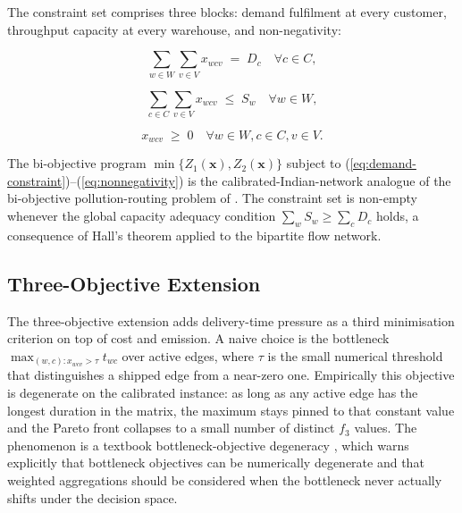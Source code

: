 \documentclass[review,preprint,authoryear,12pt]{elsarticle}
\begin{document}
The constraint set comprises three blocks: demand fulfilment at
every customer, throughput capacity at every warehouse, and
non-negativity:

\begin{equation}
\sum_{w \in W} \sum_{v \in V} x_{wcv} \;=\; D_c
\quad \forall c \in C,
\label{eq:demand-constraint}
\end{equation}

\begin{equation}
\sum_{c \in C} \sum_{v \in V} x_{wcv} \;\leq\; S_w
\quad \forall w \in W,
\label{eq:capacity-constraint}
\end{equation}

\begin{equation}
x_{wcv} \;\geq\; 0
\quad \forall w \in W, c \in C, v \in V.
\label{eq:nonnegativity}
\end{equation}

The bi-objective program $\min \{Z_1(\mathbf{x}), Z_2(\mathbf{x})\}$
subject to (\ref{eq:demand-constraint})--(\ref{eq:nonnegativity}) is
the calibrated-Indian-network analogue of the bi-objective
pollution-routing problem of \citet{demir2014bi_objective_prp}. The
constraint set is non-empty whenever the global capacity adequacy
condition $\sum_w S_w \geq \sum_c D_c$ holds, a consequence of
Hall's theorem applied to the bipartite flow network.

\subsection{Three-Objective Extension}
\label{sec:formulation:threeobj}

The three-objective extension adds delivery-time pressure as a third
minimisation criterion on top of cost and emission. A naive choice is
the bottleneck $\max_{(w, c) : x_{wcv} > \tau} t_{wc}$ over active
edges, where $\tau$ is the small numerical threshold that
distinguishes a shipped edge from a near-zero one. Empirically this
objective is degenerate on the calibrated instance: as long as any
active edge has the longest duration in the matrix, the maximum stays
pinned to that constant value and the Pareto front collapses to a
small number of distinct $f_3$ values. The phenomenon is a textbook
bottleneck-objective degeneracy
\citep[\S6.2]{deb2001moo_book}, which warns explicitly that
bottleneck objectives can be numerically degenerate and that weighted
aggregations should be considered when the bottleneck never actually
shifts under the decision space.
\end{document}

